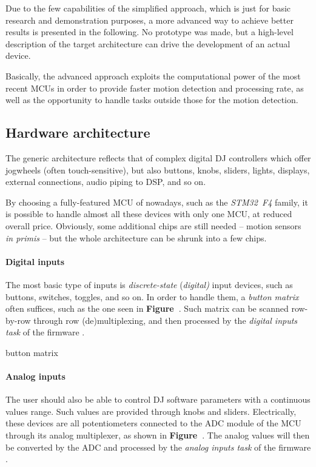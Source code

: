 \documentclass[a4paper,10pt]{article}
\begin{document}
\begin{multicols}{2}
Due to the few capabilities of the simplified approach, which is just for
basic research and demonstration purposes, a more advanced way to achieve
better results is presented in the following. No prototype was made, but a
high-level description of the target architecture can drive the development
of an actual device.

Basically, the advanced approach exploits the computational power of the most
recent MCUs in order to provide faster motion detection and processing rate,
as well as the opportunity to handle tasks outside those for the motion
detection.

\TODO


\subsection{Hardware architecture}

The generic architecture reflects that of complex digital DJ controllers
which offer jogwheels (often touch-sensitive), but also buttons, knobs,
sliders, lights, displays, external connections, audio piping to DSP, and so
on.

By choosing a fully-featured MCU of nowadays, such as the \emph{STM32~F4}
family, it is possible to handle almost all these devices with only one MCU,
at reduced overall price. Obviously, some additional chips are still needed
-- motion sensors \emph{in primis} -- but the whole architecture can be shrunk
into a few chips.


\paragraph{Digital inputs}
The most basic type of inputs is \emph{discrete-state} (\emph{digital)} input
devices, such as buttons, switches, toggles, and so on. In order to handle
them, a \emph{button matrix} often suffices, such as the one seen in
\textbf{Figure~\CITEME}. Such matrix can be scanned row-by-row through row
(de)multiplexing, and then processed by the \emph{digital inputs task} of the
firmware \CITEME.

\INSFIG button matrix


\paragraph{Analog inputs}
The user should also be able to control DJ software parameters with a 
continuous values range. Such values are provided through knobs and sliders.
Electrically, these devices are all potentiometers connected to the ADC module
of the MCU through its analog multiplexer, as shown in \textbf{Figure~\CITEME}.
The analog values will then be converted by the ADC and processed by the
\emph{analog inputs task} of the firmware \CITEME.


\end{multicols}
\end{document}
